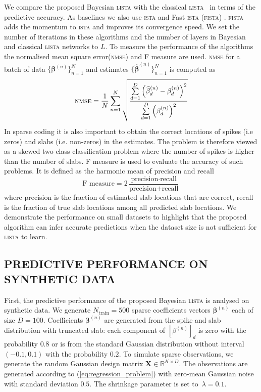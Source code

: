\documentclass[letterpaper]{article}
\begin{document}
We compare the proposed Bayesian \textsc{lista} with the classical \textsc{lista}~\citep{gregor2010learning} in terms of the predictive accuracy. As baselines we also use \textsc{ista} \citep{daubechies2004iterative} and Fast \textsc{ista} (\textsc{fista}) \citep{beck2009fast}. \textsc{fista} adds the momentum to \textsc{ista} and improves its convergence speed. We set the number of iterations in these algorithms and the number of layers in Bayesian and classical \textsc{lista} networks to $L$. To measure the performance of the algorithms the normalised mean square error(\textsc{nmse}) and F measure are used. \textsc{nmse} for a batch of data $\{\boldsymbol\beta^{(n)}\}_{n=1}^{N}$ and estimates $\{\widehat{\boldsymbol\beta}^{(n)}\}_{n=1}^{N}$ is computed as
\begin{equation}
\text{\textsc{nmse}} = \frac{1}{N}\sum\limits_{n=1}^N\sqrt{\frac{\sum\limits_{d=1}^D\left(\widehat{\beta}_{d}^{(n)} - \beta_d^{(n)}\right)^2}{\sum\limits_{d=1}^D\left(\beta_{d}^{(n)}\right)^2}}
\end{equation}
In sparse coding it is also important to obtain the correct locations of spikes (i.e zeros) and slabs (i.e. non-zeros) in the estimates. The problem is therefore viewed as a skewed two-class classification problem where the number of spikes is higher than the number of slabs. F measure is used to evaluate the accuracy of such problems. It is defined as the harmonic mean of precision and recall
\begin{equation}
\text{F measure} = 2\dfrac{\text{precision}\cdot\text{recall}}{\text{precision} + \text{recall}}
\end{equation}
where precision is the fraction of estimated slab locations that are correct, recall is the fraction of true slab locations among all predicted slab locations.
We demonstrate the performance on small datasets to highlight that the proposed algorithm can infer accurate predictions when the dataset size is not sufficient for \textsc{lista} to learn.

\subsection{\uppercase{Predictive performance on synthetic data}}
First, the predictive performance of the proposed Bayesian \textsc{lista} is analysed on synthetic data. We generate $N_\text{train}=500$ sparse coefficients vectors $\boldsymbol\beta^{(n)}$ each of size $D = 100$. Coefficients $\boldsymbol\beta^{(n)}$ are generated from the spike and slab distribution with truncated slab: each component of $[\beta^{(n)}]_{d}$ is zero with the probability $0.8$ or is from the standard Gaussian distribution without interval $(-0.1, 0.1)$ with the probability $0.2$. To simulate sparse observations, we generate the random Gaussian design matrix $\mathbf{X} \in \mathbb{R}^{K \times D}$.  The observations are generated according to (\ref{eq:regression_problem}) with zero-mean Gaussian noise with standard deviation $0.5$. The shrinkage parameter is set to~$\lambda = 0.1$.
\end{document}
